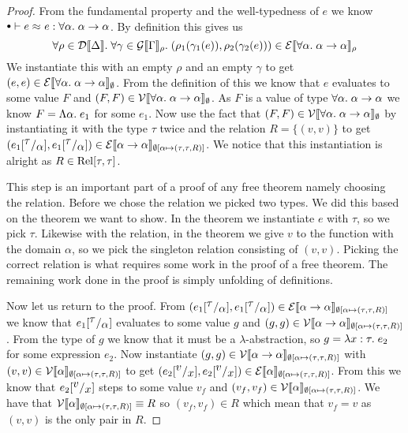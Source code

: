 \begin{proof}
\newcommand{\aaa}{\ensuremath{\forall \alpha. \; \tarrow{\alpha}{\alpha}}}
From the fundamental property and the well-typedness of $e$ we know $\mtenv \vdash \lreq{e}{e} : \aaa$. By definition this gives us
\[
\forall \rho \in \dpred{\Delta}. \; \forall \gamma \in \gprep{\Gamma}. \; (\rho_1(\gamma_1(e)),\rho_2(\gamma_2(e))) \in \eprep{\aaa}
\]
\newcommand{\mt}{\ensuremath{\emptyset}}
We instantiate this with an empty $\rho$ and an empty $\gamma$ to get $(e,e) \in \eprep[\mt]{\aaa}$. From the definition of this we know that $e$ evaluates to some value $F$ and $(F,F) \in \vprep[\mt]{\aaa}$. As $F$ is a value of type \aaa{} we know $F=\Lambda \alpha . \; e_1$ for some $e_1$. Now use the fact that $(F,F) \in \vprep[\mt]{\aaa}$ by instantiating it with the type $\tau$ twice and the relation $R=\{(v,v)\}$ to get 
\newcommand{\env}{\ensuremath{\extsub{\mt}{\alpha}{(\tau,\tau,R)}}}
\newcommand{\taa}{\ensuremath{\tarrow{\alpha}{\alpha}}}
$(\subst{e_1}{\tau}{\alpha},\subst{e_1}{\tau}{\alpha})\in \eprep[\env]{\taa}$. We notice that this instantiation is alright as $R \in \operatorname{Rel}[\tau,\tau]$.

This step is an important part of a proof of any free theorem namely choosing the relation. Before we chose the relation we picked two types. We did this based on the theorem we want to show. In the theorem we instantiate $e$ with $\tau$, so we pick $\tau$. Likewise with the relation, in the theorem we give $v$ to the function with the domain $\alpha$, so we pick the singleton relation consisting of $(v,v)$. Picking the correct relation is what requires some work in the proof of a free theorem. The remaining work done in the proof is simply unfolding of definitions.

Now let us return to the proof. From $(\subst{e_1}{\tau}{\alpha},\subst{e_1}{\tau}{\alpha})\in \eprep[\env]{\taa}$ we know that $e_1[^{\textstyle \tau}/_{\textstyle \alpha}]$ evaluates to some value $g$ and $(g,g)\in \vprep[\env]{\taa}$. From the type of $g$ we know that it must be a $\lambda$-abstraction, so $g=\lambda x : \tau . \; e_2$ for some expression $e_2$. Now instantiate $(g,g)\in \vprep[\env]{\taa}$ with $(v,v) \in \vprep[\env]{\alpha}$ to get $(\subst{e_2}{v}{x},\subst{e_2}{v}{x}) \in \eprep[\env]{\alpha}$. From this we know that $e_2[^{\textstyle v}/_{\textstyle x}]$ steps to some value $v_f$ and $(v_f,v_f) \in \vprep[\env]{\alpha}$. We have that $\vprep[\env]{\alpha} \equiv R$ so $(v_f,v_f) \in R$ which mean that $v_f = v$ as $(v,v)$ is the only pair in $R$.


\end{proof}
